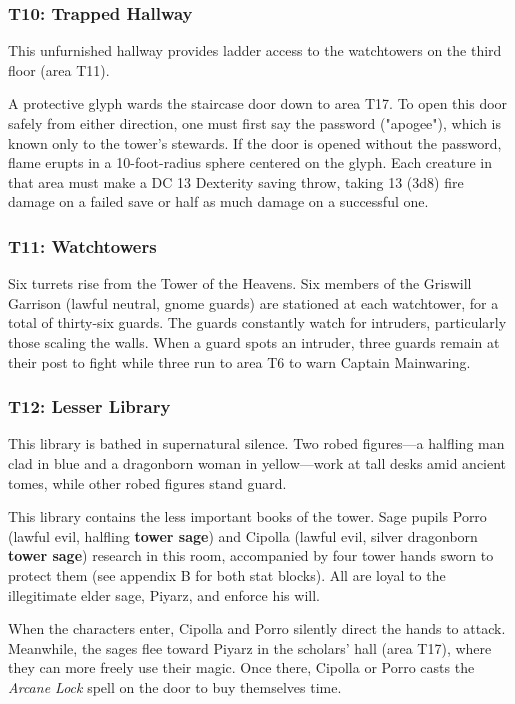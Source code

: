 \documentclass[10pt,a4paper,twoside,bg=print,twocolumn,openany,nodeprecatedcode]{dndbook}
\begin{document}
\subsubsection{T10: Trapped Hallway}
This unfurnished hallway provides ladder access to the watchtowers on the third floor (area T11).

A protective glyph wards the staircase door down to area T17. To open this door safely from either direction, one must first say the password ("apogee"), which is known only to the tower's stewards. If the door is opened without the password, flame erupts in a 10-foot-radius sphere centered on the glyph. Each creature in that area must make a DC 13 Dexterity saving throw, taking 13 (3d8) fire damage on a failed save or half as much damage on a successful one.

\subsubsection{T11: Watchtowers}
Six turrets rise from the Tower of the Heavens. Six members of the Griswill Garrison (lawful neutral, gnome guards) are stationed at each watchtower, for a total of thirty-six guards. The guards constantly watch for intruders, particularly those scaling the walls. When a guard spots an intruder, three guards remain at their post to fight while three run to area T6 to warn Captain Mainwaring.

\subsubsection{T12: Lesser Library}
\begin{DndReadAloud}{}
This library is bathed in supernatural silence. Two robed figures—a halfling man clad in blue and a dragonborn woman in yellow—work at tall desks amid ancient tomes, while other robed figures stand guard.

\end{DndReadAloud}

This library contains the less important books of the tower. Sage pupils Porro (lawful evil, halfling \textbf{tower sage}) and Cipolla (lawful evil, silver dragonborn \textbf{tower sage}) research in this room, accompanied by four tower hands sworn to protect them (see appendix B for both stat blocks). All are loyal to the illegitimate elder sage, Piyarz, and enforce his will.

When the characters enter, Cipolla and Porro silently direct the hands to attack. Meanwhile, the sages flee toward Piyarz in the scholars' hall (area T17), where they can more freely use their magic. Once there, Cipolla or Porro casts the \textit{Arcane Lock} spell on the door to buy themselves time.
\end{document}
